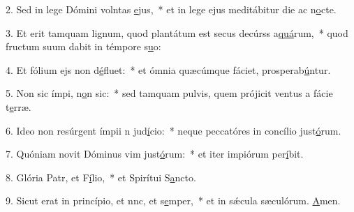 2. Sed in lege Dómini volntas \uline{e}jus,~* et in lege ejus meditábitur die ac n\uline{o}cte.\par 
3. Et erit tamquam lignum, quod plantátum est secus decúrss a\uline{quá}rum,~* quod fructum suum dabit in témpore s\uline{u}o:\par 
4. Et fólium ejs non d\uline{é}fluet:~* et ómnia quæcúmque fáciet, prosperab\uline{ú}ntur.\par 
5. Non sic ímpi, n\uline{o}n sic:~* sed tamquam pulvis, quem prójicit ventus a fácie t\uline{e}rræ.\par 
6. Ideo non resúrgent ímpii n jud\uline{í}cio:~* neque peccatóres in concílio just\uline{ó}rum.\par 
7. Quóniam novit Dóminus vim just\uline{ó}rum:~* et iter impiórum per\uline{í}bit.\par 
8. Glória Patr, et F\uline{í}lio,~* et Spirítui S\uline{a}ncto.\par 
9. Sicut erat in princípio, et nnc, et s\uline{e}mper,~* et in sǽcula sæculórum. \uline{A}men.\par 
